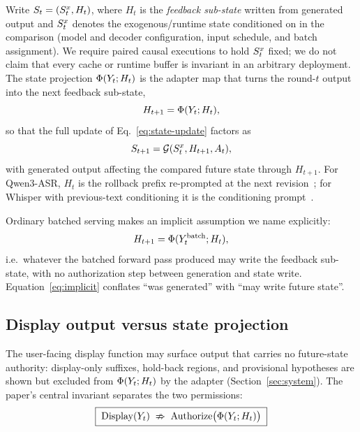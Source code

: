 \begin{definition}\label{def:projection}
Write $S_t = (S_t^{x}, H_t)$, where $H_t$ is the \emph{feedback
sub-state} written from generated output and $S_t^{x}$ denotes the
exogenous/runtime state conditioned on in the comparison (model and decoder
configuration, input schedule, and batch assignment). We require paired
causal executions to hold $S_t^{x}$ fixed; we do not claim that every
cache or runtime buffer is invariant in an arbitrary deployment. The state projection
$\Phi(Y_t;H_t)$ is the adapter map that turns the round-$t$ output into
the next feedback sub-state,
\begin{equation}\label{eq:feedback-update}
  H_{t+1} = \Phi(Y_t;H_t),
\end{equation}
so that the full update of Eq.~\eqref{eq:state-update} factors as
\begin{equation}\label{eq:state-update-h}
  S_{t+1} = \mathcal{G}(S_t^{x},H_{t+1},A_t),
\end{equation}
with generated output affecting the compared future state through
$H_{t+1}$. For
Qwen3-ASR, $H_t$ is the rollback prefix re-prompted at the next
revision~\cite{shi2026qwen3asr}; for Whisper with previous-text
conditioning it is the conditioning prompt~\cite{radford2023whisper}.
\end{definition}

Ordinary batched serving makes an implicit assumption we name explicitly:
\begin{equation}\label{eq:implicit}
  H_{t+1} = \Phi(Y_t^{\mathrm{batch}};H_t),
\end{equation}
i.e.\ whatever the batched forward pass produced may write the feedback
sub-state, with no authorization step between generation and state write.
Equation~\eqref{eq:implicit} conflates ``was generated'' with ``may write
future state''.

\subsection{Display output versus state projection}\label{sec:model:display}

The user-facing display function may surface output that carries no
future-state authority: display-only suffixes, hold-back regions, and
provisional hypotheses are shown but excluded from
$\Phi(Y_t;H_t)$ by the adapter (Section~\ref{sec:system}). The
paper's central invariant separates the two permissions:
\begin{equation}\label{eq:invariant}
  \boxed{\;\mathrm{Display}(Y_t)\;\nRightarrow\;
  \mathrm{Authorize}\bigl(\Phi(Y_t;H_t)\bigr)\;}
\end{equation}

